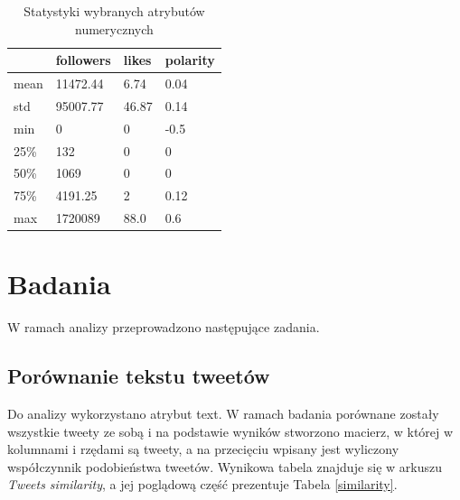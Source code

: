 \documentclass{classrep}
\begin{document}
\begin{table}[H]
    \caption{Statystyki wybranych atrybutów numerycznych}
    \label{stats}
    \centering
    \begin{tabular}{|l|l|l|l|}
        \hline
              & followers & likes & polarity \\ \hline
        mean  & 11472.44  & 6.74  & 0.04     \\ \hline
        std   & 95007.77  & 46.87 & 0.14     \\ \hline
        min   & 0         & 0     & -0.5     \\ \hline
        25\%  & 132       & 0     & 0        \\ \hline
        50\%  & 1069      & 0     & 0        \\ \hline
        75\%  & 4191.25   & 2     & 0.12     \\ \hline
        max   & 1720089   & 88.0  & 0.6      \\ \hline
    \end{tabular}
\end{table}

\section{Badania}

W ramach analizy przeprowadzono następujące zadania.

\subsection{Porównanie tekstu tweetów}

Do analizy wykorzystano atrybut text. W ramach badania porównane zostały wszystkie tweety ze sobą i na podstawie wyników stworzono macierz, w której w kolumnami i rzędami są tweety, a na przecięciu wpisany jest wyliczony współczynnik podobieństwa tweetów. Wynikowa tabela znajduje się w arkuszu \textit{Tweets similarity}, a jej poglądową część prezentuje Tabela \ref{similarity}.
\end{document}
